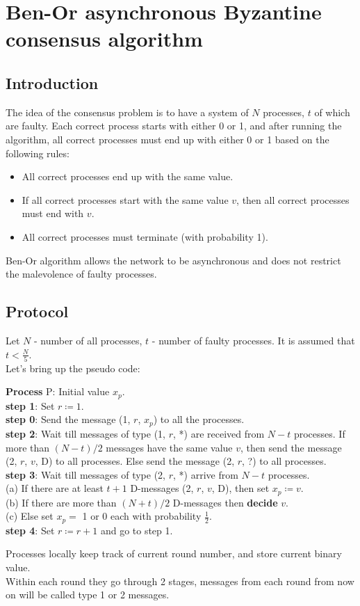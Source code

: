 \documentclass[12pt, a4paper]{article}
\begin{document}
\newtheorem{lemma}{Lemma}
\newtheorem{theorem}{Theorem}

\section*{Ben-Or asynchronous Byzantine consensus algorithm}
\subsection*{Introduction}
The idea of the consensus problem is to have a system of $N$ processes, $t$ of which are faulty. Each correct process starts with either 0 or 1, and after running the algorithm, all correct processes must end up with either 0 or 1 based on the following rules:
\begin{itemize}
    \item All correct processes end up with the same value.
    \item If all correct processes start with the same value $v$, then all correct processes must end with $v$.
    \item All correct processes must terminate (with probability 1).
\end{itemize}
Ben-Or algorithm allows the network to be asynchronous and does not restrict the malevolence of faulty processes.
\subsection*{Protocol}
Let $N$ - number of all processes, $t$ - number of faulty processes. It is assumed that $t<\frac{N}{5}$.\\
Let's bring up the pseudo code\cite{Ben83}:
\begin{flushleft}
\textbf{Process} P: Initial value $x_p$.\\
\textbf{step 1}: Set $r\coloneqq 1$.\\
\textbf{step 0}: Send the message (1, $r$, $x_p$) to all the
processes.\\
\textbf{step 2}: Wait till messages of type (1, $r$, *) are received from $N-t$ processes. If more than $(N-t)/2$ messages have the same value $v$, then send the message (2, $r$, $v$, D) to all processes. Else send the message (2, $r$, ?) to all processes.\\
\textbf{step 3}: Wait till messages of type (2, $r$, *) arrive from $N-t$ processes.\\
(a) If there are at least $t+1$ D-messages (2, $r$, $v$, D), then set $x_p \coloneqq v$.\\
(b) If there are more than $(N + t)/2$ D-messages then \textbf{decide} $v$.\\
(c) Else set $x_p=$ 1 or 0 each with probability $\frac{1}{2}$.\\
\textbf{step 4}: Set $r \coloneqq r + 1$ and go to step 1.
\end{flushleft}
Processes locally keep track of current round number, and store current binary value.\\
Within each round they go through 2 stages, messages from each round from now on will be called type 1 or 2 messages.
\end{document}
